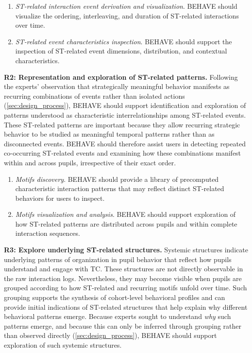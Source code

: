 \documentclass[letterpaper,journal]{IEEEtran}
\begin{document}
\begin{enumerate}[label=T\arabic*., left=0cm, noitemsep, topsep=0pt, parsep=0pt]
    \item \textit{ST-related interaction event derivation and visualization}. 
    \textsc{BEHAVE} should visualize the ordering, interleaving, and duration of ST-related interactions over time.

    \item \textit{ST-related event characteristics inspection}. 
    \textsc{BEHAVE} should support the inspection of ST-related event dimensions, distribution, and contextual characteristics.
\end{enumerate}

\noindent
\textbf{R2: Representation and exploration of ST-related patterns.}
Following the experts' observation that strategically meaningful behavior manifests as recurring combinations of events rather than isolated actions (\cref{sec:design_process}), \textsc{BEHAVE} should support identification and exploration of patterns understood as characteristic interrelationships among ST-related events. 
These ST-related patterns are important because they allow recurring strategic behavior to be studied as meaningful temporal patterns rather than as disconnected events. 
\textsc{BEHAVE} should therefore assist users in detecting repeated co-occurring ST-related events and examining how these combinations manifest within and across pupils, irrespective of their exact order.

\begin{enumerate}[label=T\arabic*., start=3, left=0cm, noitemsep, topsep=0pt, parsep=0pt]
    \item \textit{Motifs discovery}. 
    \textsc{BEHAVE} should provide a library of precomputed characteristic interaction patterns that may reflect distinct ST-related behaviors for users to inspect.
    
    \item \textit{Motifs visualization and analysis}. 
    \textsc{BEHAVE} should support exploration of how ST-related patterns are distributed across pupils and within complete interaction sequences.
\end{enumerate}

\noindent
\textbf{R3: Explore underlying ST-related structures.}
Systemic structures indicate underlying patterns of organization in pupil behavior that reflect how pupils understand and engage with TC.
These structures are not directly observable in the raw interaction logs. 
Nevertheless, they may become visible when pupils are grouped according to how ST-related and recurring motifs unfold over time. 
Such grouping supports the synthesis of cohort-level behavioral profiles and can provide initial indications of ST-related structures that help explain why different behavioral patterns emerge.
Because experts sought to understand \textit{why} such patterns emerge, and because this can only be inferred through grouping rather than observed directly (\cref{sec:design_process}), \textsc{BEHAVE} should support exploration of such systemic structures.
\end{document}
